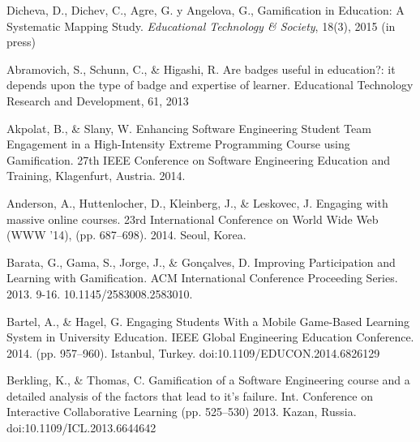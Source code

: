\begin{thebibliography}{9}
        Dicheva, D., Dichev, C., Agre, G. y Angelova, G.,
        Gamification in Education: A Systematic Mapping Study. {\it Educational Technology \& Society},
        18(3), 2015 (in press)

        Abramovich, S., Schunn, C., \& Higashi, R.
        Are badges useful in education?: it depends upon the type of badge and expertise of learner.
        Educational Technology Research and Development, 61, 2013

        Akpolat, B., \& Slany, W.
        Enhancing Software Engineering Student Team Engagement in a High-Intensity Extreme Programming Course using Gamification.
        27th IEEE Conference on Software Engineering Education and Training, Klagenfurt, Austria. 2014.
    
        Anderson, A., Huttenlocher, D., Kleinberg, J., \& Leskovec, J.
        Engaging with massive online courses.
        23rd International Conference on World Wide Web (WWW '14), (pp. 687–698). 2014. Seoul, Korea.

        Barata, G., Gama, S., Jorge, J., \& Gonçalves, D.
        Improving Participation and Learning with Gamification.
        ACM International Conference Proceeding Series. 2013. 9-16. 10.1145/2583008.2583010. 

        Bartel,  A., \& Hagel,  G.
        Engaging Students With a Mobile Game-Based Learning System in University Education.
        IEEE Global Engineering Education Conference. 2014. (pp. 957–960). Istanbul, Turkey. doi:10.1109/EDUCON.2014.6826129

        Berkling, K., \& Thomas, C.
        Gamification of a Software Engineering course and a detailed analysis of the factors that lead to it's failure.
        Int. Conference on Interactive Collaborative Learning (pp. 525–530) 2013. Kazan, Russia. doi:10.1109/ICL.2013.6644642


\end{thebibliography}
